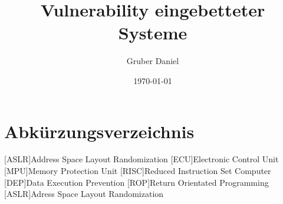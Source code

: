 \documentclass[a4paper,
DIV=13,
12pt,
BCOR=10mm,
department=FakIM,
oneside,
parskip=half,
automark,
listof=totocnumbered,
bibliography=totocnumbered,
acronym=totocnumbered
] {OTHRartcl}
\date{\today}
\title{Vulnerability eingebetteter Systeme}
\author{Gruber Daniel}
\begin{document}
\maketitle

\tableofcontents
\newpage

\section*{Abkürzungsverzeichnis}
\label{abkuerzungsverzeichnis}
\begin{acronym}[AUTOSAR]
  [ASLR]{Address Space Layout Randomization}
  [ECU]{Electronic Control Unit}
  [MPU]{Memory Protection Unit}
  [RISC]{Reduced Instruction Set Computer}
  [DEP]{Data Execution Prevention}
  [ROP]{Return Orientated Programming}
  [ASLR]{Adress Space Layout Randomization}
\end{acronym}
\newpage

\end{document}
